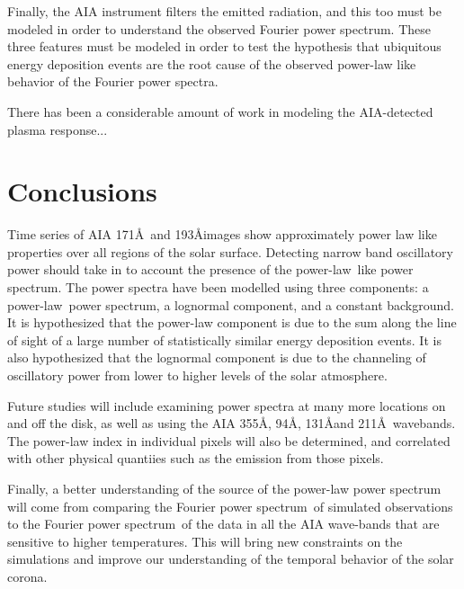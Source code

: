 \documentclass{aastex}
\newcommand{\PS}{power spectrum}
\newcommand{\PL}{power-law}
\newcommand{\Fps}{Fourier \PS}
\begin{document}
{Finally, the AIA instrument
filters the emitted radiation, and this too must be modeled in order
to understand the observed \Fps.  These three features must be modeled
in order to test the hypothesis that ubiquitous energy deposition
events are the root cause of the observed power-law like behavior of
the Fourier power spectra.

There has been a considerable amount of work in modeling the
AIA-detected plasma response...  \cite{} 



\section{Conclusions}\label{sec:conc}

Time series of AIA 171\AA\ and 193\AA images show approximately power
law like properties over all regions of the solar surface.  Detecting
narrow band oscillatory power should take in to account the presence
of the \PL\ like \PS.  The power spectra have been
modelled using three components: a \PL\ \PS, a
lognormal component, and a constant background.  It is hypothesized
that the power-law component is due to the sum along the line of sight
of a large number of statistically similar energy deposition events.
It is also hypothesized that the lognormal component is due to the
channeling of oscillatory power from lower to higher levels of the
solar atmosphere.

Future studies will include examining power spectra at many more
locations on and off the disk, as well as using the AIA 355\AA, 94\AA,
131\AA and 211\AA\ wavebands.  The power-law index in
individual pixels will also be determined, and correlated with other
physical quantiies such as the emission from those pixels.

Finally, a better understanding of the source of the power-law power
spectrum will come from comparing the \Fps\ of simulated observations
to the \Fps\ of the data in all the AIA wave-bands that are sensitive
to higher temperatures.  This will bring new constraints on the
simulations and improve our understanding of the
temporal behavior of the solar corona.




}
\end{document}

